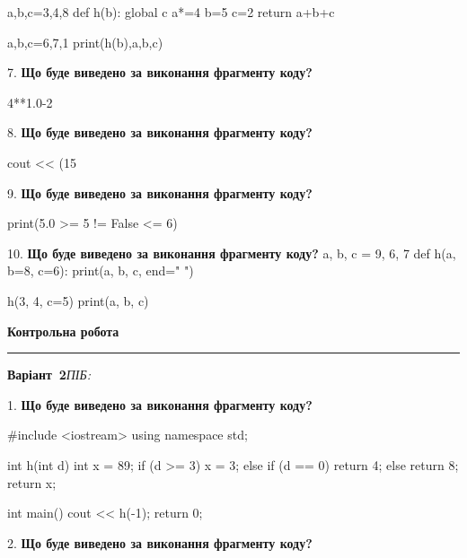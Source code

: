 \documentclass[11pt]{article}
\begin{document}
a,b,c=3,4,8
def h(b):
global c    a*=4
    b=5
    c=2
    return a+b+c

a,b,c=6,7,1
print(h(b),a,b,c)
\par\vspace{5mm}
7. \textbf{Що буде виведено за виконання фрагменту коду?}

4**1.0-2
\par\vspace{5mm}
8. \textbf{Що буде виведено за виконання фрагменту коду?}

cout << (15 %
\par\vspace{5mm}
9. \textbf{Що буде виведено за виконання фрагменту коду?}

print(5.0 >= 5 != False <= 6)
\par\vspace{5mm}
10. \textbf{Що буде виведено за виконання фрагменту коду?}
a, b, c = 9, 6, 7
def h(a, b=8, c=6):
    print(a, b, c, end=" ")

h(3, 4, c=5)
print(a, b, c)
\par\vspace{5mm}










\newpage

\newpage

{\centering\Large\bfseries Контрольна робота\par}
\medskip
\noindent\rule{\linewidth}{0.5pt}
\smallskip
\noindent\textbf{Варіант \No\,2}\hfill \textit{ПІБ:}\,\underline{\hspace{60mm}}
\vspace{4mm}

1. \textbf{Що буде виведено за виконання фрагменту коду?}

#include <iostream>
using namespace std;

int h(int d){
    int x = 89;
    if (d >= 3) 
        x = 3;
    else if (d == 0)
         return 4;
    else
         return 8;
    return x;
}

int main(){
    cout << h(-1);
    return 0;
}

\par\vspace{5mm}
2. \textbf{Що буде виведено за виконання фрагменту коду?}
\end{document}
